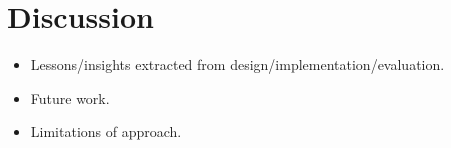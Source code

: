 \section{Discussion}

\begin{itemize}
\item Lessons/insights extracted from design/implementation/evaluation.
\item Future work.
\item Limitations of approach.
\end{itemize}
